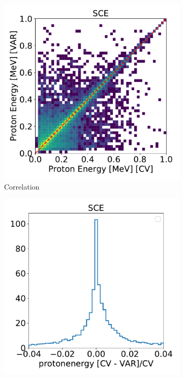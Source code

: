 \documentclass[a4paper]{article}
\begin{document}
\begin{figure}[H] 
\begin{center}
    \begin{subfigure}[b]{0.3\textwidth}
    \centering
    \includegraphics[width=1.00\textwidth]{detsys/energy/protonenergy_corr_03252020_SCE.pdf}
    \caption{\label{fig:detsys:proton:corr}Correlation}
    \end{subfigure}
    \begin{subfigure}[b]{0.3\textwidth}
    \centering
    \includegraphics[width=1.00\textwidth]{detsys/energy/protonenergy_1d_03252020_SCE.pdf}

\end{subfigure}
\end{center}
\end{figure}
\end{document}
